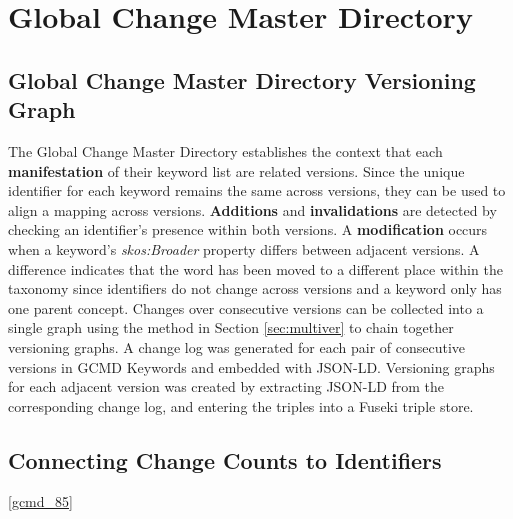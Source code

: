 \section{Global Change Master Directory}

\subsection{Global Change Master Directory Versioning Graph}

The Global Change Master Directory establishes the context that each \textbf{manifestation} of their keyword list are related versions.
Since the unique identifier for each keyword remains the same across versions, they can be used to align a mapping across versions.
\textbf{Additions} and \textbf{invalidations} are detected by checking an identifier's presence within both versions.
A \textbf{modification} occurs when a keyword's \textit{skos:Broader} property differs between adjacent versions.
A difference indicates that the word has been moved to a different place within the taxonomy since identifiers do not change across versions and a keyword only has one parent concept.
Changes over consecutive versions can be collected into a single graph using the method in Section \ref{sec:multiver} to chain together versioning graphs.
A change log was generated for each pair of consecutive versions in GCMD Keywords and embedded with JSON-LD.
Versioning graphs for each adjacent version was created by extracting JSON-LD from the corresponding change log, and entering the triples into a Fuseki triple store.

\subsection{Connecting Change Counts to Identifiers} \ref{gcmd_85}

